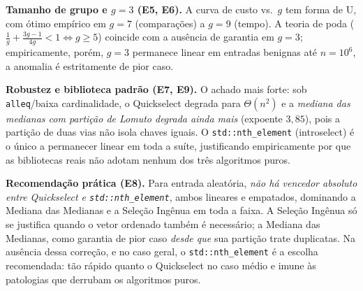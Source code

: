 \documentclass{infufrgs}
\begin{document}
\textbf{Tamanho de grupo e $g = 3$ (E5, E6).} A curva de custo vs.\ $g$ tem forma de U, com ótimo empírico em $g = 7$ (comparações) a $g = 9$ (tempo). A teoria de poda ($\tfrac1g + \tfrac{3g-1}{4g} < 1 \Leftrightarrow g \ge 5$) coincide com a ausência de garantia em $g = 3$; empiricamente, porém, $g = 3$ permanece linear em entradas benignas até $n = 10^6$, a anomalia é estritamente de pior caso.

\textbf{Robustez e biblioteca padrão (E7, E9).} O achado mais forte: sob \texttt{alleq}/baixa cardinalidade, o Quickselect degrada para $\Theta(n^2)$ e a \emph{mediana das medianas com partição de Lomuto degrada ainda mais} (expoente $3{,}85$), pois a partição de duas vias não isola chaves iguais. O \texttt{std::nth\_element} (introselect) é o único a permanecer linear em toda a suíte, justificando empiricamente por que as bibliotecas reais não adotam nenhum dos três algoritmos puros.

\textbf{Recomendação prática (E8).} Para entrada aleatória, \emph{não há vencedor absoluto entre Quickselect e \texttt{std::nth\_element}}, ambos lineares e empatados, dominando a Mediana das Medianas e a Seleção Ingênua em toda a faixa. A Seleção Ingênua só se justifica quando o vetor ordenado também é necessário; a Mediana das Medianas, como garantia de pior caso \emph{desde que} sua partição trate duplicatas. Na ausência dessa correção, e no caso geral, o \texttt{std::nth\_element} é a escolha recomendada: tão rápido quanto o Quickselect no caso médio e imune às patologias que derrubam os algoritmos puros.
\end{document}
